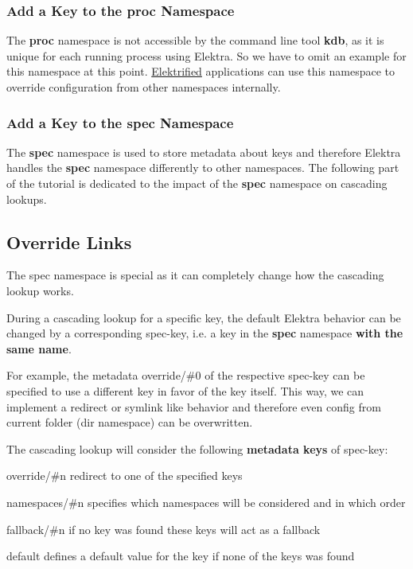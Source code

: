 \subsubsection*{Add a Key to the proc Namespace}

The {\bfseries proc} namespace is not accessible by the command line tool {\bfseries kdb}, as it is unique for each running process using Elektra. So we have to omit an example for this namespace at this point. \hyperlink{md_doc_help_elektra-glossary_doc_help_elektra-glossary_md}{Elektrified} applications can use this namespace to override configuration from other namespaces internally.

\subsubsection*{Add a Key to the spec Namespace}

The {\bfseries spec} namespace is used to store metadata about keys and therefore Elektra handles the {\bfseries spec} namespace differently to other namespaces. The following part of the tutorial is dedicated to the impact of the {\bfseries spec} namespace on cascading lookups.

\subsection*{Override Links}

The {\ttfamily spec} namespace is special as it can completely change how the cascading lookup works.

During a cascading lookup for a specific key, the default Elektra behavior can be changed by a corresponding {\ttfamily spec-\/key}, i.\+e. a key in the {\bfseries spec} namespace {\bfseries with the same name}.

For example, the metadata {\ttfamily override/\#0} of the respective {\ttfamily spec-\/key} can be specified to use a different key in favor of the key itself. This way, we can implement a redirect or symlink like behavior and therefore even config from current folder ({\ttfamily dir} namespace) can be overwritten.

The cascading lookup will consider the following {\bfseries metadata keys} of {\ttfamily spec-\/key}\+:


\begin{DoxyEnumerate}
\item {\ttfamily override/\#n} redirect to one of the specified keys
\item {\ttfamily namespaces/\#n} specifies which namespaces will be considered and in which order
\item {\ttfamily fallback/\#n} if no key was found these keys will act as a fallback
\item {\ttfamily default} defines a default value for the key if none of the keys was found
\end{DoxyEnumerate}


